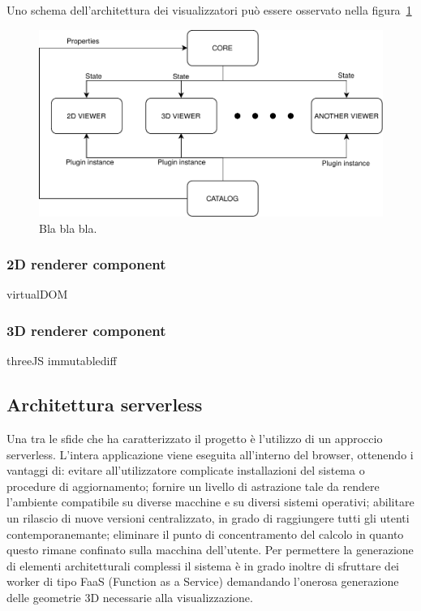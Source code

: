 Uno schema dell'architettura dei visualizzatori pu\`o essere osservato nella figura~\ref{fig_visualizators}
\begin{figure}[!t]
\centering
\includegraphics[width=\linewidth]{contents/images/diagramma-visualizzatori}

\caption{Bla bla bla.}
\label{fig_visualizators}
\end{figure}

\subsubsection{2D renderer component}
virtualDOM


\subsubsection{3D renderer component}
threeJS immutablediff

\subsection{Architettura serverless}
Una tra le sfide che ha caratterizzato il progetto è l'utilizzo di un approccio serverless. L'intera applicazione viene eseguita all'interno del browser, ottenendo i vantaggi di: evitare all'utilizzatore complicate installazioni del sistema o procedure di aggiornamento; fornire un livello di astrazione tale da rendere l'ambiente compatibile su diverse macchine e su diversi sistemi operativi; abilitare un rilascio di nuove versioni centralizzato, in grado di raggiungere tutti gli utenti contemporanemante; eliminare il punto di concentramento del calcolo in quanto questo rimane confinato sulla macchina dell'utente.
Per permettere la generazione di elementi architetturali complessi il sistema è in grado inoltre di sfruttare dei worker di tipo FaaS (Function as a Service) demandando l'onerosa generazione delle geometrie 3D necessarie alla visualizzazione.